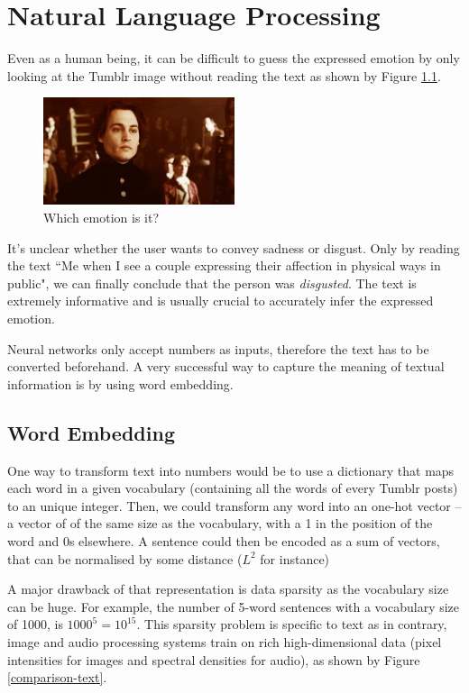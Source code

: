 \chapter{Natural Language Processing}
Even as a human being, it can be difficult to guess the expressed emotion by only looking at the Tumblr image without reading the text as shown by Figure \ref{disgusted-unclear}.

\begin{figure}[H]
    \centering
    \includegraphics[width=0.5\textwidth]{Images/disgusted.jpg}
    \caption{Which emotion is it?}
    \label{disgusted-unclear}
\end{figure}

It's unclear whether the user wants to convey sadness or disgust. Only by reading the text ``Me when I see a couple expressing their affection in physical ways in public", we can finally conclude that the person was {\em disgusted}. The text is extremely informative and is usually crucial to accurately infer the expressed emotion.

Neural networks only accept numbers as inputs, therefore the text has to be converted beforehand. A very successful way to capture the meaning of textual information is by using word embedding.
\newpage
\section{Word Embedding}
One way to transform text into numbers would be to use a dictionary that maps each word in a given vocabulary (containing all the words of every Tumblr posts) to an unique integer. Then, we could transform any word into an one-hot vector -- a vector of of the same size as the vocabulary, with a 1 in the position of the word and 0s elsewhere. A sentence could then be encoded as a sum of vectors, that can be normalised by some distance ($L^2$ for instance)

A major drawback of that representation is data sparsity as the vocabulary size can be huge. For example, the number of 5-word sentences with a vocabulary size of 1000, is $1000^5=10^{15}$. This sparsity problem is specific to text as in contrary, image and audio processing systems train on rich high-dimensional data (pixel intensities for images and spectral densities for audio), as shown by Figure \ref{comparison-text}.


